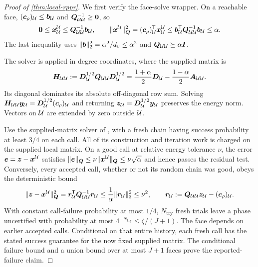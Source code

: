\begin{proof}[Proof of \cref{thm:local-rppr}]
We first verify the face-solve wrapper.  On a reachable face,
$(\bm{c}_\rho)_{\mathcal{U}}\leq\bm{b}_{\mathcal{U}}$ and $\bm{Q}_{\mathcal{U}\mathcal{U}}^{-1}\geq\bm{0}$, so
\begin{equation*}
 \bm{0}\leq\bm{x}_{\mathcal{U}}^{\mathcal{U}}\leq\bm{Q}_{\mathcal{U}\mathcal{U}}^{-1}\bm{b}_{\mathcal{U}},
 \qquad
 \lVert\bm{x}^{\mathcal{U}}\rVert_{\bm{Q}}^2
 =(\bm{c}_\rho)_{\mathcal{U}}^{\mathsf{T}}\bm{x}_{\mathcal{U}}^{\mathcal{U}}
 \leq\bm{b}_{\mathcal{U}}^{\mathsf{T}}\bm{Q}_{\mathcal{U}\mathcal{U}}^{-1}\bm{b}_{\mathcal{U}}\leq\alpha.
\end{equation*}
The last inequality uses
$\lVert\bm{b}\rVert_2^2=\alpha^2/d_v\leq\alpha^2$ and
$\bm{Q}_{\mathcal{U}\mathcal{U}}\succeq\alpha\bm{I}$.

The solver is applied in degree coordinates, where the supplied matrix is
\begin{equation*}
 \bm{H}_{\mathcal{U}\mathcal{U}}:=\bm{D}_{\mathcal{U}}^{1/2}\bm{Q}_{\mathcal{U}\mathcal{U}}\bm{D}_{\mathcal{U}}^{1/2}
 =\frac{1+\alpha}{2}\bm{D}_{\mathcal{U}}-\frac{1-\alpha}{2}\bm{A}_{\mathcal{U}\mathcal{U}}.
\end{equation*}
Its diagonal dominates its absolute off-diagonal row sum. Solving
$\bm{H}_{\mathcal{U}\mathcal{U}}\bm{y}_{\mathcal{U}}=\bm{D}_{\mathcal{U}}^{1/2}(\bm{c}_\rho)_{\mathcal{U}}$ and returning
$\bm{z}_{\mathcal{U}}=\bm{D}_{\mathcal{U}}^{1/2}\bm{y}_{\mathcal{U}}$ preserves the energy norm.
Vectors on $\mathcal{U}$ are extended by zero outside $\mathcal{U}$.

Use the supplied-matrix solver of
\citet[Lemma~4.5 and Theorem~4.6]{koutis2011nearly}, with a fresh
chain having success probability at least $3/4$ on each call. All of its
construction and iteration work is charged on the supplied local matrix.  On a good call at relative energy tolerance $\nu$, the error
$\bm{e}=\bm{z}-\bm{x}^{\mathcal{U}}$ satisfies
$\lVert\bm{e}\rVert_{\bm{Q}}\leq\nu\lVert\bm{x}^{\mathcal{U}}\rVert_{\bm{Q}}\leq\nu\sqrt\alpha$ and hence
passes the residual test.  Conversely, every accepted call, whether or not
its random chain was good, obeys the deterministic bound
\begin{equation*}
 \lVert\bm{z}-\bm{x}^{\mathcal{U}}\rVert_{\bm{Q}}^2
 =\bm{r}_{\mathcal{U}}^{\mathsf{T}}\bm{Q}_{\mathcal{U}\mathcal{U}}^{-1}\bm{r}_{\mathcal{U}}
 \leq\frac1\alpha\lVert\bm{r}_{\mathcal{U}}\rVert_2^2
 \leq\nu^2,
 \qquad
 \bm{r}_{\mathcal{U}}:=\bm{Q}_{\mathcal{U}\mathcal{U}}\bm{z}_{\mathcal{U}}-(\bm{c}_\rho)_{\mathcal{U}}.
\end{equation*}
With constant call-failure probability at most $1/4$, $N_{\mathrm{try}}$ fresh trials
leave a phase uncertified with probability at most
$4^{-N_{\mathrm{try}}}\leq\zeta/(J+1)$.  The face depends on earlier accepted calls. Conditional on that entire
history, each fresh call has the stated success guarantee for the now fixed
supplied matrix. The conditional failure bound and a union bound over at
most $J+1$ faces prove the reported-failure claim.


\end{proof}
